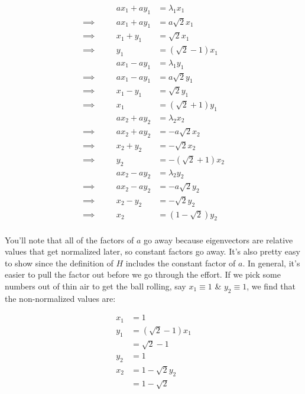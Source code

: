 \begin{answer}
  \begin{equation}
    \begin{alignedat}{2}
      & & ax_1 + ay_1 &= \lambda_1x_1\\
      \implies \quad & & ax_1 + ay_1 &= a\sqrt{2}x_1\\
      \implies \quad & & x_1 + y_1 &= \sqrt{2}x_1\\
      \implies \quad & & y_1 &= (\sqrt{2} - 1)x_1\\
      & & ax_1 - ay_1 &= \lambda_1y_1\\
      \implies \quad & & ax_1 - ay_1 &= a\sqrt{2}y_1\\
      \implies \quad & & x_1 - y_1 &= \sqrt{2}y_1\\
      \implies \quad & & x_1 &= (\sqrt{2} + 1)y_1\\
      & & ax_2 + ay_2 &= \lambda_2x_2\\
      \implies \quad & & ax_2 + ay_2 &= -a\sqrt{2}x_2\\
      \implies \quad & & x_2 + y_2 &= -\sqrt{2}x_2\\
      \implies \quad & & y_2 &= -(\sqrt{2} + 1)x_2\\
      & & ax_2 - ay_2 &= \lambda_2y_2\\
      \implies \quad & & ax_2 - ay_2 &= -a\sqrt{2}y_2\\
      \implies \quad & & x_2 - y_2 &= -\sqrt{2}y_2\\
      \implies \quad & & x_2 &= (1 - \sqrt{2})y_2\\
    \end{alignedat}
  \end{equation}

  You'll note that all of the factors of $a$ go away because
  eigenvectors are relative values that get normalized later, so
  constant factors go away.  It's also pretty easy to show since the
  definition of $H$ includes the constant factor of $a$.  In general,
  it's easier to pull the factor out before we go through the effort.
  If we pick some numbers out of thin air to get the ball rolling, say
  $x_1 \equiv 1$ \& $y_2 \equiv 1$, we find that the non-normalized
  values are:
  
  \begin{equation}
    \begin{split}
      x_1 &= 1\\
      y_1 &= (\sqrt{2} - 1)x_1\\
      &= \sqrt{2} - 1\\
      y_2 &= 1\\
      x_2 &= 1 - \sqrt{2}y_2\\
      &= 1 - \sqrt{2}\\
    \end{split}
  \end{equation}


\end{answer}
